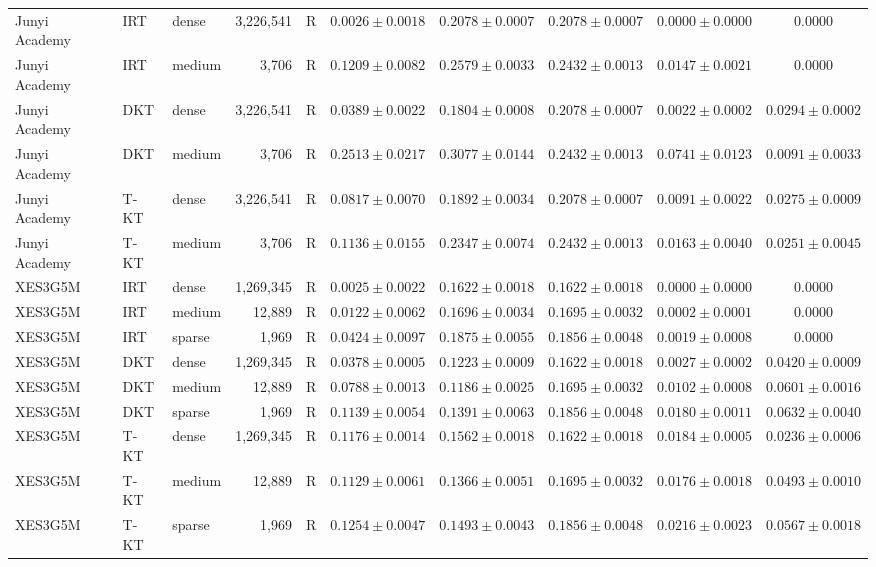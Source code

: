 \begin{table}[htbp]
{\begin{tabular}{lllrlccccc}
\midrule
Junyi Academy & IRT & dense & 3,226,541 & R & $0.0026\pm0.0018$ & $0.2078\pm0.0007$ & $0.2078\pm0.0007$ & $0.0000\pm0.0000$ & $0.0000$ \\
Junyi Academy & IRT & medium & 3,706 & R & $0.1209\pm0.0082$ & $0.2579\pm0.0033$ & $0.2432\pm0.0013$ & $0.0147\pm0.0021$ & $0.0000$ \\
Junyi Academy & DKT & dense & 3,226,541 & R & $0.0389\pm0.0022$ & $0.1804\pm0.0008$ & $0.2078\pm0.0007$ & $0.0022\pm0.0002$ & $0.0294\pm0.0002$ \\
Junyi Academy & DKT & medium & 3,706 & R & $0.2513\pm0.0217$ & $0.3077\pm0.0144$ & $0.2432\pm0.0013$ & $0.0741\pm0.0123$ & $0.0091\pm0.0033$ \\
Junyi Academy & T-KT & dense & 3,226,541 & R & $0.0817\pm0.0070$ & $0.1892\pm0.0034$ & $0.2078\pm0.0007$ & $0.0091\pm0.0022$ & $0.0275\pm0.0009$ \\
Junyi Academy & T-KT & medium & 3,706 & R & $0.1136\pm0.0155$ & $0.2347\pm0.0074$ & $0.2432\pm0.0013$ & $0.0163\pm0.0040$ & $0.0251\pm0.0045$ \\
\midrule
XES3G5M & IRT & dense & 1,269,345 & R & $0.0025\pm0.0022$ & $0.1622\pm0.0018$ & $0.1622\pm0.0018$ & $0.0000\pm0.0000$ & $0.0000$ \\
XES3G5M & IRT & medium & 12,889 & R & $0.0122\pm0.0062$ & $0.1696\pm0.0034$ & $0.1695\pm0.0032$ & $0.0002\pm0.0001$ & $0.0000$ \\
XES3G5M & IRT & sparse & 1,969 & R & $0.0424\pm0.0097$ & $0.1875\pm0.0055$ & $0.1856\pm0.0048$ & $0.0019\pm0.0008$ & $0.0000$ \\
XES3G5M & DKT & dense & 1,269,345 & R & $0.0378\pm0.0005$ & $0.1223\pm0.0009$ & $0.1622\pm0.0018$ & $0.0027\pm0.0002$ & $0.0420\pm0.0009$ \\
XES3G5M & DKT & medium & 12,889 & R & $0.0788\pm0.0013$ & $0.1186\pm0.0025$ & $0.1695\pm0.0032$ & $0.0102\pm0.0008$ & $0.0601\pm0.0016$ \\
XES3G5M & DKT & sparse & 1,969 & R & $0.1139\pm0.0054$ & $0.1391\pm0.0063$ & $0.1856\pm0.0048$ & $0.0180\pm0.0011$ & $0.0632\pm0.0040$ \\
XES3G5M & T-KT & dense & 1,269,345 & R & $0.1176\pm0.0014$ & $0.1562\pm0.0018$ & $0.1622\pm0.0018$ & $0.0184\pm0.0005$ & $0.0236\pm0.0006$ \\
XES3G5M & T-KT & medium & 12,889 & R & $0.1129\pm0.0061$ & $0.1366\pm0.0051$ & $0.1695\pm0.0032$ & $0.0176\pm0.0018$ & $0.0493\pm0.0010$ \\
XES3G5M & T-KT & sparse & 1,969 & R & $0.1254\pm0.0047$ & $0.1493\pm0.0043$ & $0.1856\pm0.0048$ & $0.0216\pm0.0023$ & $0.0567\pm0.0018$ \\
\bottomrule
\end{tabular}%
}
\end{table}
